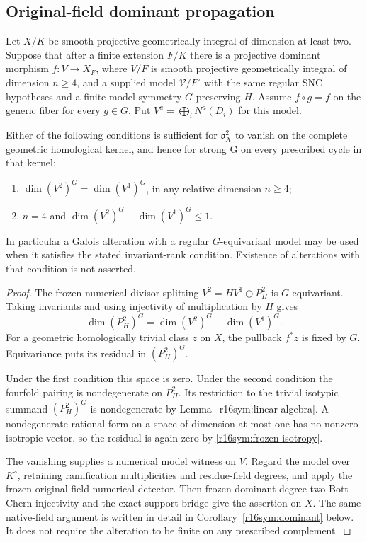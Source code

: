 \subsection{Original-field dominant propagation}

\begin{corollary}
\label{r16sym:invariant-cover}
Let $X/K$ be smooth projective geometrically integral of
dimension at least two.  Suppose that after a finite
extension $F/K$ there is a projective dominant morphism
$f:V\to X_F$, where $V/F$ is smooth projective geometrically
integral of dimension $n\geq4$, and a supplied model
$\mathcal V/F^\circ$ with the same regular SNC hypotheses
and a finite model symmetry $G$ preserving $H$.
Assume $f\circ g=f$ on the generic fiber for every $g\in G$.
Put $V^a=\bigoplus_iN^a(D_i)$ for this model.

Either of the following conditions is sufficient for
$\mathfrak o_X^2$ to vanish on the complete geometric
homological kernel, and hence for strong G on every
prescribed cycle in that kernel:
\begin{enumerate}
\item $\dim (V^2)^G=\dim (V^1)^G$, in any relative
      dimension $n\geq4$;
\item $n=4$ and
      $\dim (V^2)^G-\dim (V^1)^G\leq1$.
\end{enumerate}
In particular a Galois alteration with a regular
$G$-equivariant model may be used when it satisfies the
stated invariant-rank condition.  Existence of alterations
with that condition is not asserted.
\end{corollary}

\begin{proof}
The frozen numerical divisor splitting
$V^2=H V^1\oplus P_H^2$ is $G$-equivariant.  Taking
invariants and using injectivity of multiplication by
$H$ gives
\[
             \dim(P_H^2)^G
                    =\dim(V^2)^G-\dim(V^1)^G.
\tag{ER16.11}\label{r16sym:invariant-rank}
\]
For a geometric homologically trivial class $z$ on $X$,
the pullback $f^*z$ is fixed by $G$.  Equivariance puts
its residual in $(P_H^2)^G$.

Under the first condition this space is zero.  Under
the second condition the fourfold pairing is
nondegenerate on $P_H^2$.  Its restriction to the
trivial isotypic summand $(P_H^2)^G$ is nondegenerate
by Lemma~\ref{r16sym:linear-algebra}.  A nondegenerate
rational form on a space of dimension at most one has
no nonzero isotropic vector, so the residual is again
zero by \eqref{r16sym:frozen-isotropy}.

The vanishing supplies a numerical model witness on
$V$.  Regard the model over $K^\circ$, retaining
ramification multiplicities and residue-field degrees,
and apply the frozen original-field numerical detector.
Then frozen dominant degree-two Bott--Chern injectivity
and the exact-support bridge give the assertion on $X$.
The same native-field argument is written in detail in
Corollary~\ref{r16sym:dominant} below.  It does not require
the alteration to be finite on any prescribed complement.
\end{proof}

